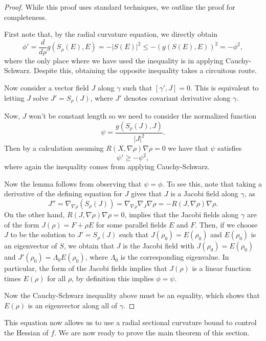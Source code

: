 \documentclass{amsart}
\theoremstyle{plain}
\numberwithin{equation}{section}
\begin{document}
\begin{proof}
While this proof uses standard techniques, we outline the proof for completeness.

First note that, by the radial curvature equation, we directly obtain 
\[ \phi' = \frac{d}{d\rho} g(S_\rho(E), E) = -|S(E)|^2 \leq -(g(S(E), E))^2  = - \phi^2,  \]
where the only place where we have used the inequality is in applying Cauchy-Schwarz.  Despite this, obtaining the opposite inequality takes a circuitous route. 

Now consider a vector field $J$ along $\gamma$ such that $[ \gamma', J]=0$.  This is equivalent to letting $J$ solve $J' = S_{\rho}(J)$, where $J'$ denotes covariant derivative along $\gamma.$

Now, $J$ won't be constant length so we need to consider the normalized function 
\[ \psi = \frac{ g(S_{\rho}(J), J )}{|J|^2}.  \]
Then by a calculation assuming $R(X, \nabla \rho) \nabla \rho = 0$  we have that $\psi$ satisfies
\[ \psi ' \geq - \psi^2, \]
where again the inequality comes from applying Cauchy-Schwarz.  

Now the lemma follows from observing that $\psi=\phi$.  To see this, note that taking a derivative of the defining equation for $J$ gives that $J$ is a Jacobi field along $\gamma$, as  
\[ J'' = \nabla_{\nabla \rho} (S_\rho(J)) = \nabla_{\nabla \rho} \nabla_J \nabla \rho = - R(J, \nabla \rho)\nabla \rho .\]
 On the other hand, $R(J ,\nabla \rho) \nabla \rho = 0$, implies that the Jacobi fields along $\gamma$ are of the form $J(\rho) = F + \rho E$ for some parallel fields $E$ and $F$.  Then,  if we choose $J$ to be the solution to  $J' = S_{\rho}(J)$ such that $J(\rho_0) = E(\rho_0)$ and $E(\rho_0)$ is an eigenvector of $S$, we obtain that $J$ is the Jacobi field with $J(\rho_0) = E(\rho_0)$ and $J'(\rho_0) = \Lambda_0 E (\rho_0)$, where $\Lambda_0$ is the corresponding eigenvalue.  In particular, the form of the Jacobi fields implies that $J(\rho)$ is a linear function times $E(\rho)$ for all $\rho$, by definition this implies $\phi = \psi$. 

 Now the Cauchy-Schwarz inequality above must be an equality, which shows that $E(\rho)$ is an eigenvector along all of $\gamma$.
\end{proof}
This equation now allows us to use a radial sectional curvature bound to control the Hessian of $f$. We are now ready to prove the main theorem of this section. 
\end{document}
